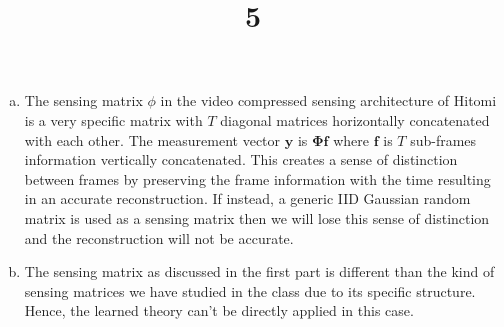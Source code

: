 \documentclass[a4paper]{article}
\title{5}
\date{}
\begin{document}
\maketitle
\begin{enumerate}[(a)]
\item The sensing matrix $\phi$ in the video compressed sensing architecture of Hitomi is a very specific matrix with $T$ diagonal matrices horizontally concatenated with each other. The measurement vector $\bm{y}$ is $\bm{\Phi f}$ where $\bm{f}$ is $T$ sub-frames information vertically concatenated. This creates a sense of distinction between frames by preserving the frame information with the time resulting in an accurate reconstruction. If instead, a generic IID Gaussian random matrix is used as a sensing matrix then we will lose this sense of distinction and the reconstruction will not be accurate.
\item The sensing matrix as discussed in the first part is different than the kind of sensing matrices we have studied in the class due to its specific structure. Hence, the learned theory can't be directly applied in this case.
\end{enumerate}
\end{document}
